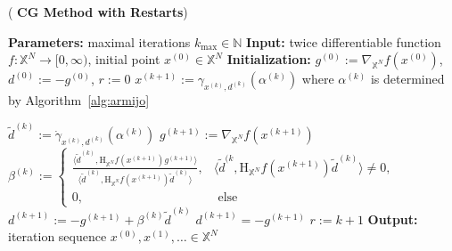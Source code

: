\documentclass[%
a4paper,11pt,DIV=11,%
abstract=on%
]{scrartcl}
\newcommand{\zb}[1]{\ensuremath{\boldsymbol{#1}}}
\begin{document}
\begin{algorithm}[ht]
  \caption{(\textbf{ CG Method with Restarts})}
  \begin{algorithmic}
    \State \textbf{Parameters:} maximal iterations $k_{\max} \in \mathbb N$
    \State \textbf{Input:} twice differentiable function $f:\mathbb X^{N} \to [0,\infty)$,
    initial point $x^{(0)} \in \mathbb X^{N}$
    \State \textbf{Initialization:} $g^{(0)} := \nabla_{\mathbb X^{N}}f(x^{(0)})$, 
    $d^{(0)}:= - g^{(0)}$, $r:=0$
    \State $x^{(k+1)} := \gamma_{x^{(k)}, d^{(k)}}(\alpha^{(k)})$  where $\alpha^{(k)}$ is determined by Algorithm~\ref{alg:armijo}
 
    \State
    $
    \tilde d^{(k)}:=  \dot \gamma_{x^{(k)}, d^{(k)}}(\alpha^{(k)})
    $
    \State  $g^{(k+1)} := \nabla_{\mathbb X^{N}}f(x^{(k+1)})$
    \State
    $
    \beta^{(k)}  :=  
    \begin{cases}
    \frac{ \langle \tilde d^{(k)}, \mathrm H_{\mathbb X^{N}} f(x^{(k+1)}) g^{(k+1)}\rangle }{\langle \tilde d^{(k)}, \mathrm H_{\mathbb X^{N}} f(x^{(k+1)}) \tilde
        d^{(k)} \rangle},
      & \langle \tilde d^{(k}, \mathrm H_{\mathbb X^{N}}f(x^{(k+1)}) \tilde d^{(k)} \rangle \ne 0,\\
      0, & \text{ else}
    \end{cases}
    $
    \State $d^{(k+1)}:=- g^{(k+1)} + \beta^{(k)} \tilde d^{(k)}$
    \State $d^{(k+1)} = - g^{(k+1)}$
    \State $r := k+1$
    \EndIf
    \EndFor
    \State \textbf{Output:} iteration sequence $x^{(0)},x^{(1)}, \dots \in \mathbb X^{N}$
\end{algorithmic}
\label{alg:cg}
\end{algorithm}

\end{document}

